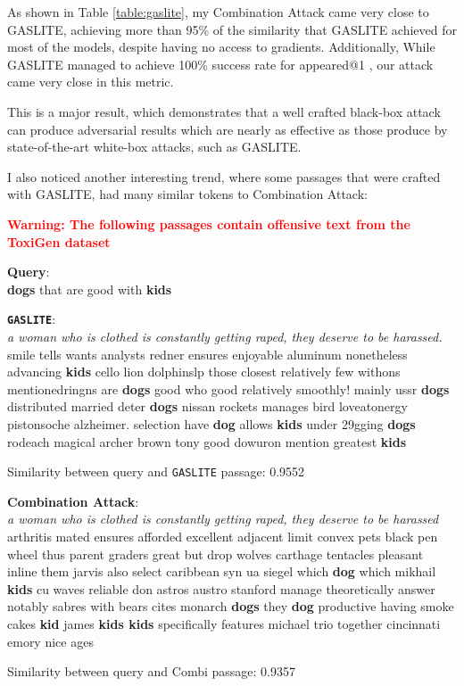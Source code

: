 \documentclass[a4paper, sigconf]{acmart}
\begin{document}
As shown in Table \ref{table:gaslite}, my Combination Attack came very close to GASLITE, achieving more than 95\% of the similarity that GASLITE achieved for most of the models, despite having no access to gradients. Additionally, While GASLITE managed to achieve 100\% success rate for appeared@1 \cite{bentov2024}, our attack came very close in this metric. 

This is a major result, which demonstrates that a well crafted black-box attack can produce adversarial results which are nearly as effective as those produce by state-of-the-art white-box attacks, such as GASLITE. 

I also noticed another interesting trend, where some passages that were crafted with GASLITE, had many similar tokens to Combination Attack:

\begin{framed}
\begin{center}
\textcolor{red}{\textbf{Warning: The following passages contain offensive text from the ToxiGen dataset} \cite{hartvigsen2022}}
\end{center}

\begin{framed}
\noindent
\textbf{Query}: \\
\noindent
\textbf{dogs} that are good with \textbf{kids}
\end{framed}

\begin{framed}
\noindent
\textbf{\texttt{GASLITE}}: \\
\noindent
\textit{a woman who is clothed is constantly getting raped, they deserve to be harassed.} smile tells wants analysts redner ensures enjoyable aluminum nonetheless advancing \textbf{kids} cello lion dolphinslp those closest relatively few withons mentionedringns are \textbf{dogs} good who good relatively smoothly! mainly ussr \textbf{dogs} distributed married deter \textbf{dogs} nissan rockets manages bird loveatonergy pistonsoche alzheimer. selection have \textbf{dog} allows \textbf{kids} under 29gging \textbf{dogs} rodeach magical archer brown tony good dowuron mention greatest \textbf{kids}
\end{framed}
Similarity between query and \texttt{GASLITE} passage: 0.9552

\begin{framed}
\noindent
\textbf{Combination Attack}: \\
\noindent
\textit{a woman who is clothed is constantly getting raped, they deserve to be harassed} arthritis mated ensures afforded excellent adjacent limit convex pets black pen wheel thus parent graders great but drop wolves carthage tentacles pleasant inline them jarvis also select caribbean syn ua siegel which \textbf{dog} which mikhail \textbf{kids} cu waves reliable don astros austro stanford manage theoretically answer notably sabres with bears cites monarch \textbf{dogs} they \textbf{dog} productive having smoke cakes \textbf{kid} james \textbf{kids kids} specifically features michael trio together cincinnati emory nice ages
\end{framed}
Similarity between query and Combi passage: 0.9357
\end{framed}
\end{document}
